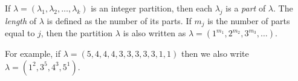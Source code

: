 \documentclass[12pt]{article}
\begin{document}
If $\lambda=(\lambda_1,\lambda_2,\ldots,\lambda_k)$ is an integer partition, then each $\lambda_j$ is a \emph{part} of $\lambda$. The \emph{length} of $\lambda$ is defined as the number of its parts.
If $m_j$ is the number of parts equal to $j$, then the partition $\lambda$ is also written as $\lambda = (1^{m_1},2^{m_2},3^{m_3},\ldots)$.

For example, if $\lambda=(5,4,4,4,3,3,3,3,3,1,1)$ then we also write $\lambda=(1^2,3^5,4^3,5^1)$.
\end{document}
